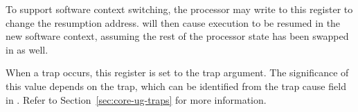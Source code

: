 To support software context switching, the processor may write to this register
to change the resumption address.  will then cause execution to be
resumed in the new software context, assuming the rest of the processor state
has been swapped in as well.

\implementation{}


When a trap occurs, this register is set to the trap argument. The significance
of this value depends on the trap, which can be identified from the trap cause
field in . Refer to Section~\ref{sec:core-ug-traps} for more
information.

\implementation{}

